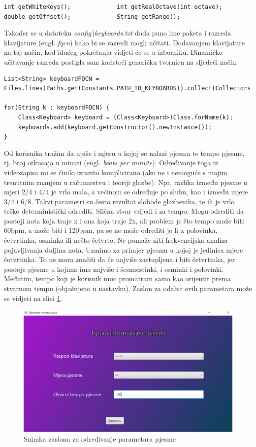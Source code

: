 \documentclass[times, utf8, zavrsni, numeric]{fer}
\begin{document}
\begin{lstlisting}
int getWhiteKeys();				int getRealOctave(int octave);
double getOffset();				String getRange();
\end{lstlisting}

Također se u datoteku \textit{config\textbackslash keyboards.txt} doda puno ime paketa i razreda klavijature (engl. \textit{fqcn}) kako bi se razredi mogli učitati. Dodavanjem klavijature na taj način, kod idućeg pokretanja vidjeti će se u izborniku. Dinamičko učitavanje razreda postigla sam koristeći generičku tvornicu na sljedeći način:

\begin{lstlisting}
List<String> keyboardFQCN = Files.lines(Paths.get(Constants.PATH_TO_KEYBOARDS)).collect(Collectors.toList());

for(String k : keyboardFQCN) {
	Class<Keyboard> keyboard = (Class<Keyboard>)Class.forName(k);
	keyboards.add(keyboard.getConstructor().newInstance());
}
\end{lstlisting}

Od korisnika tražim da upiše i mjeru u kojoj se nalazi pjesma te tempo pjesme, tj. broj otkucaja u minuti (engl. \textit{beats per minute}). Određivanje toga iz videozapisa mi se činilo izrazito komplicirano (ako ne i nemoguće s mojim trenutnim znanjem u računarstvu i teoriji glazbe). Npr. razlika između pjesme u mjeri 2/4 i 4/4 je vrlo mala, a većinom se određuje po sluhu, kao i između mjere 3/4 i 6/8. Takvi parametri su često rezultat slobode glazbenika, te ih je vrlo teško deterministički odrediti. Slična stvar vrijedi i za tempo. Mogu odrediti da postoji nota koja traje x i ona koja traje 2x, ali problem je što tempo može biti 60bpm, a može biti i 120bpm, pa se ne može odrediti je li x polovinka, četvrtinka, osminka ili nešto četvrto. Ne pomaže niti frekvencijska analiza pojavljivanja duljina nota. Uzmimo za primjer pjesmu u kojoj je jedinica mjere četvrtinka. To ne mora značiti da će najviše zastupljena i biti četvrtinka, jer postoje pjesme u kojima ima najviše i šesnaestinki, i osminki i polovinki. Međutim, tempo koji je korisnik unio promatram samo kao orijentir prema stvarnom tempu (objašnjeno u nastavku). Zaslon za odabir ovih parametara može se vidjeti na slici \ref{fig:screen2}.

\begin{figure}[h]
	\includegraphics[scale=0.43]{screen2.png}
	\centering
	\caption{Snimka zaslona za određivanje parametara pjesme}
	\label{fig:screen2}
\end{figure}
\end{document}
